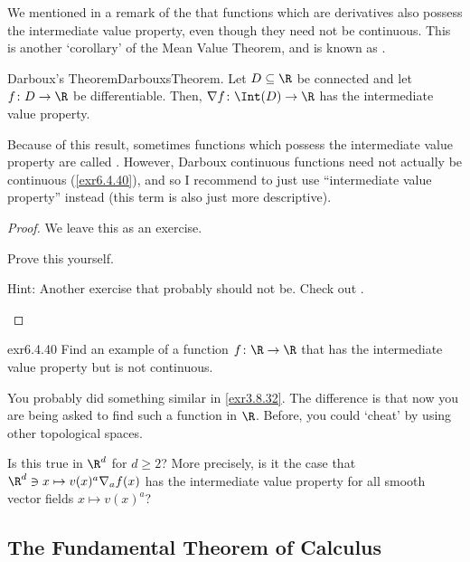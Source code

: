 We mentioned in a remark of the  that functions which are derivatives also possess the intermediate value property, even though they need not be continuous.  This is another `corollary' of the Mean Value Theorem, and is known as .
\begin{thm}{Darboux's Theorem}{DarbouxsTheorem}.
Let $D\subseteq \R$ be connected and let $f\colon D\rightarrow \R$ be differentiable.  Then, $\nabla f\colon \Int (D)\rightarrow \R$ has the intermediate value property.
\begin{rmk}
Because of this result, sometimes functions which possess the intermediate value property are called .  However, Darboux continuous functions need not actually be continuous (\cref{exr6.4.40}), and so I recommend to just use ``intermediate value property'' instead (this term is also just more descriptive).
\end{rmk}
\begin{proof}
We leave this as an exercise.
\begin{exr}[breakable=false]{}{}
Prove this yourself.
\begin{rmk}
Hint:  Another exercise that probably should not be.  Check out \cite[pg.~144]{Pugh}.
\end{rmk}
\end{exr}
\end{proof}
\end{thm}
\begin{exr}{}{exr6.4.40}
Find an example of a function $f\colon \R \rightarrow \R$ that has the intermediate value property but is not continuous.
\begin{rmk}
You probably did something similar in \cref{exr3.8.32}.  The difference is that now you are being asked to find such a function in $\R$.  Before, you could `cheat' by using other topological spaces.
\end{rmk}
\end{exr}
\begin{exr}{}{}
Is this true in $\R ^d$ for $d\geq 2$?  More precisely, is it the case that $\R ^d\ni x\mapsto v(x)^a\nabla _af(x)$ has the intermediate value property for all smooth vector fields $x\mapsto v(x)^a$?
\end{exr}

\subsection{The Fundamental Theorem of Calculus}

